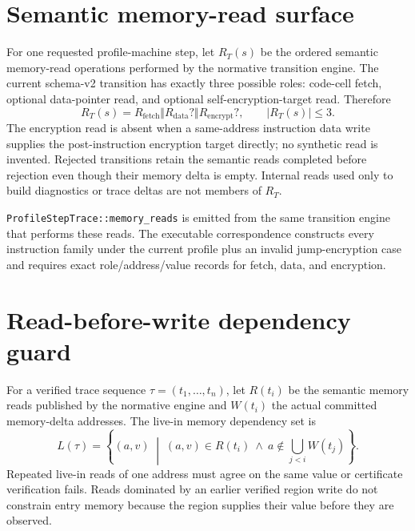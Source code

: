 \documentclass{article}
\begin{document}
\section{Semantic memory-read surface}

For one requested profile-machine step, let $R_T(s)$ be the ordered semantic
memory-read operations performed by the normative transition engine. The current
schema-v2 transition has exactly three possible roles: code-cell fetch, optional
data-pointer read, and optional self-encryption-target read. Therefore
\begin{equation}
  R_T(s)=R_{\mathrm{fetch}}\Vert R_{\mathrm{data}}?
         \Vert R_{\mathrm{encrypt}}?,
  \qquad |R_T(s)|\leq3.
  \label{eq:state-graph-profile-read-bound}
\end{equation}
The encryption read is absent when a same-address instruction data write
supplies
the post-instruction encryption target directly; no synthetic read is invented.
Rejected transitions retain the semantic reads completed before rejection even
though their memory delta is empty. Internal reads used only to build
diagnostics
or trace deltas are not members of $R_T$.

\texttt{ProfileStepTrace::memory\_reads} is emitted from the same transition
engine
that
performs these reads. The executable correspondence constructs every instruction
family under the current profile plus an invalid jump-encryption case and
requires
exact role/address/value records for fetch, data, and encryption.

\section{Read-before-write dependency guard}

For a verified trace sequence $\tau=(t_1,\ldots,t_n)$, let $R(t_i)$ be the
semantic memory reads published by the normative engine and $W(t_i)$ the actual
committed memory-delta addresses. The live-in memory dependency set is
\begin{equation}
  L(\tau)=\left\{(a,v)\;\middle|\;
    (a,v)\in R(t_i)\ \land\
    a\notin\bigcup_{j<i}W(t_j)
  \right\}.
  \label{eq:state-graph-region-live-in}
\end{equation}
Repeated live-in reads of one address must agree on the same value or
certificate
verification fails. Reads dominated by an earlier verified region write do not
constrain entry memory because the region supplies their value before they are
observed.
\end{document}
